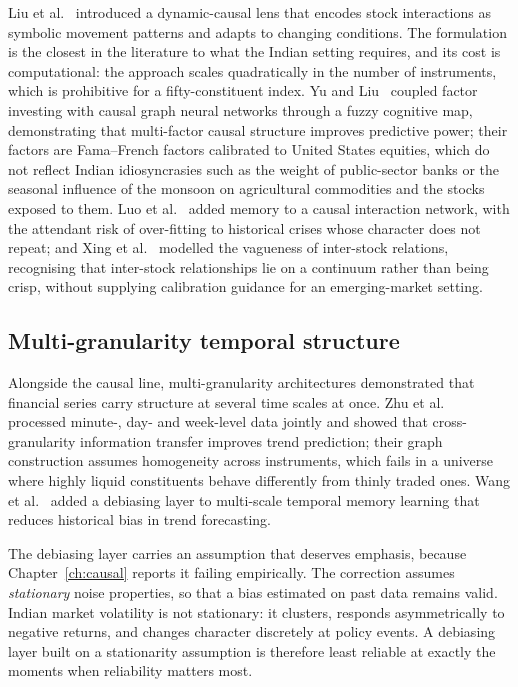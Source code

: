 Liu et al.~\cite{liu2026dynamic} introduced a dynamic-causal lens that encodes stock
interactions as symbolic movement patterns and adapts to changing conditions. The formulation
is the closest in the literature to what the Indian setting requires, and its cost is
computational: the approach scales quadratically in the number of instruments, which is
prohibitive for a fifty-constituent index. Yu and Liu~\cite{yu2025causalseqgnn} coupled factor
investing with causal graph neural networks through a fuzzy cognitive map, demonstrating that
multi-factor causal structure improves predictive power; their factors are Fama--French factors
calibrated to United States equities, which do not reflect Indian idiosyncrasies such as the
weight of public-sector banks or the seasonal influence of the monsoon on agricultural
commodities and the stocks exposed to them. Luo et al.~\cite{luo2025magicnet} added memory to a
causal interaction network, with the attendant risk of over-fitting to historical crises whose
character does not repeat; and Xing et al.~\cite{xing2024vague} modelled the vagueness of
inter-stock relations, recognising that inter-stock relationships lie on a continuum rather than
being crisp, without supplying calibration guidance for an emerging-market setting.

\subsection{Multi-granularity temporal structure}

Alongside the causal line, multi-granularity architectures demonstrated that financial series
carry structure at several time scales at once. Zhu et al.~\cite{zhu2025multigran} processed
minute-, day- and week-level data jointly and showed that cross-granularity information
transfer improves trend prediction; their graph construction assumes homogeneity across
instruments, which fails in a universe where highly liquid constituents behave differently from
thinly traded ones. Wang et al.~\cite{wang2025mtmd} added a debiasing layer to multi-scale
temporal memory learning that reduces historical bias in trend forecasting.

The debiasing layer carries an assumption that deserves emphasis, because
Chapter~\ref{ch:causal} reports it failing empirically. The correction assumes \emph{stationary}
noise properties, so that a bias estimated on past data remains valid. Indian market volatility
is not stationary: it clusters, responds asymmetrically to negative returns, and changes
character discretely at policy events. A debiasing layer built on a stationarity assumption is
therefore least reliable at exactly the moments when reliability matters most.

